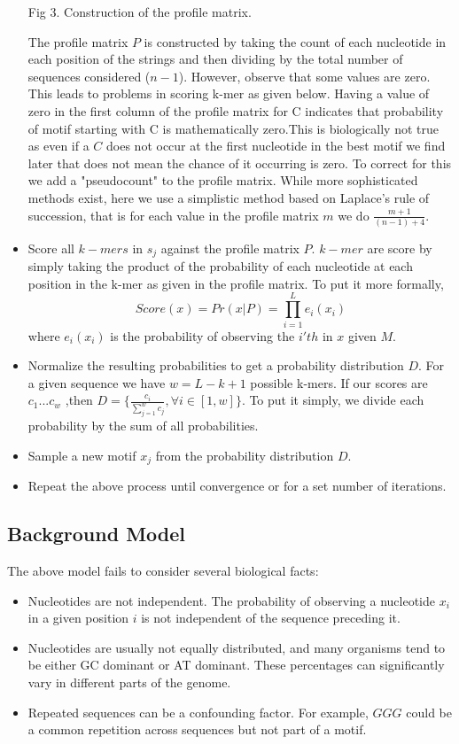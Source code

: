 \documentclass[12pt]{scrartcl} %
\begin{document}
\begin{itemize}
\begin{center}
        \newline Fig 3. Construction of the profile matrix.
    \end{center}
    The profile matrix $P$ is constructed by taking the count of each nucleotide in each position of the strings and then dividing by the total
    number of sequences considered ($n-1$). However, observe that some values are zero. This leads to problems in scoring k-mer as given below. 
    Having a value of zero in the first column of the profile matrix for C indicates that probability of motif starting with C is mathematically zero.This is biologically not true
    as even if a $C$ does not occur at the first nucleotide in the best motif we find later that does not mean the chance of it occurring is zero. 
    \newline 
    To correct for this we add a "pseudocount" to the profile matrix. While more sophisticated methods exist, here we use a simplistic method based on Laplace's rule of succession, that is for
    each value in the profile matrix $m$ we do $\frac{m+1}{(n-1) + 4}$.

    \item Score all $k-mers$ in $s_j$ against the profile matrix $P$.
    $k-mer$ are score by simply taking the product of the probability of each nucleotide at each position in the k-mer as given in the profile matrix.
    To put it more formally, $$Score(x) = Pr(x|P) = \prod_{i=1}^{L}e_i(x_i)$$ where $e_i(x_i)$ is the probability of observing the $i'th$ in $x$ given $M$.
    \item Normalize the resulting probabilities to get a probability distribution $D$.
    For a given sequence we have $w = L - k + 1$ possible k-mers. If our scores are $c_1 ... c_w$ ,then $D = \{  \frac{c_i}{\sum_{j=1}^{w} c_j} , \forall i \in [1,w] \}$. To put it simply, we divide
    each probability by the sum of all probabilities.
    \item Sample a new motif $x_j$ from the probability distribution $D$.
    \item Repeat the above process until convergence or for a set number of iterations.
\end{itemize}
 
\subsection{Background Model}
The above model fails to consider several biological facts:
\begin{itemize}
    \item Nucleotides are not independent.
    The probability of observing a nucleotide $x_i$ in a given position $i$ is not independent of the sequence preceding it.
    \item Nucleotides are usually not equally distributed, and many organisms tend to be either GC dominant or AT dominant. These percentages can significantly
    vary in different parts of the genome.
    \item Repeated sequences can be a confounding factor. For example, $GGG$ could be a common repetition across sequences but not part of a motif.
\end{itemize}
\end{document}

